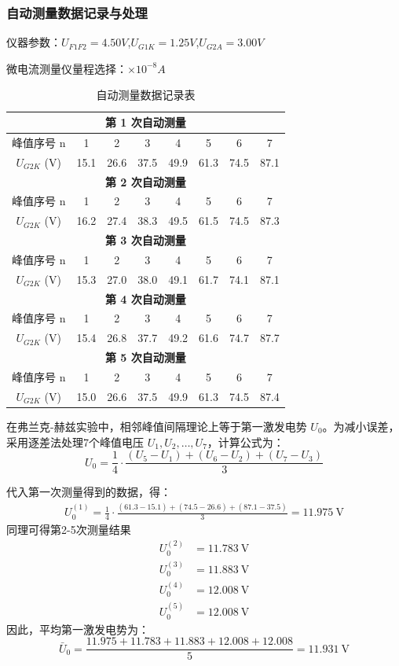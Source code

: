 \documentclass[]{../../templates/Report}%
\begin{document}
\begin{fullreportonly}
\subsubsection{自动测量数据记录与处理}
仪器参数：$U_{F1F2}=4.50V$,$U_{G1K}=1.25V$,$U_{G2A}=3.00V$
\par
微电流测量仪量程选择：$\times 10^{-8}A$
\begin{table}[H]
\centering
\caption{自动测量数据记录表} %
\label{tab:measurements}
\begin{tabular}{|c|c|c|c|c|c|c|c|}
\hline
\multicolumn{8}{|c|}{\textbf{第 1 次自动测量}} \\
\hline
峰值序号 n & 1 & 2 & 3 & 4 & 5 & 6 & 7 \\
\hline
$U_{G2K}$ (V) & 15.1&26.6 &37.5 &49.9 &61.3 &74.5 &87.1 \\
\hline
\multicolumn{8}{|c|}{\textbf{第 2 次自动测量}} \\
\hline
峰值序号 n & 1 & 2 & 3 & 4 & 5 & 6 & 7 \\
\hline
$U_{G2K}$ (V) &16.2 &27.4 &38.3 &49.5 &61.5 &74.5 &87.3 \\
\hline
\multicolumn{8}{|c|}{\textbf{第 3 次自动测量}} \\
\hline
峰值序号 n & 1 & 2 & 3 & 4 & 5 & 6 & 7 \\
\hline
$U_{G2K}$ (V) &15.3 &27.0 &38.0 &49.1 &61.7 &74.1 &87.1 \\
\hline
\multicolumn{8}{|c|}{\textbf{第 4 次自动测量}} \\
\hline
峰值序号 n & 1 & 2 & 3 & 4 & 5 & 6 & 7 \\
\hline
$U_{G2K}$ (V) &15.4 &26.8 &37.7 &49.2 &61.6 &74.7 &87.7 \\
\hline
\multicolumn{8}{|c|}{\textbf{第 5 次自动测量}} \\
\hline
峰值序号 n & 1 & 2 & 3 & 4 & 5 & 6 & 7 \\
\hline
$U_{G2K}$ (V) &15.0 &26.6 &37.5 &49.9 &61.3 &74.5 &87.4 \\
\hline
\end{tabular}
\end{table}

在弗兰克-赫兹实验中，相邻峰值间隔理论上等于第一激发电势 $U_0$。为减小误差，采用逐差法处理7个峰值电压 $U_1, U_2, \dots, U_7$，计算公式为：
\[
U_0 = \frac{1}{4} \cdot \frac{(U_5 - U_1) + (U_6 - U_2) + (U_7 - U_3)}{3}
\]

代入第一次测量得到的数据，得：
\begin{align*}
U_0^{(1)} = \frac{1}{4} \cdot \frac{(61.3 - 15.1) + (74.5 - 26.6) + (87.1 - 37.5)}{3} = \SI{11.975}{\volt}
\end{align*}
同理可得第2-5次测量结果
\begin{align*}
U_0^{(2)} &= \SI{11.783}{\volt} \\
U_0^{(3)} &= \SI{11.883}{\volt} \\
U_0^{(4)} &= \SI{12.008}{\volt} \\
U_0^{(5)} &= \SI{12.008}{\volt}
\end{align*}
因此，平均第一激发电势为：
\[
\bar{U}_0 = \frac{11.975 + 11.783 + 11.883 + 12.008 + 12.008}{5} = \SI{11.931}{\volt}
\]


\end{fullreportonly}
\end{document}
